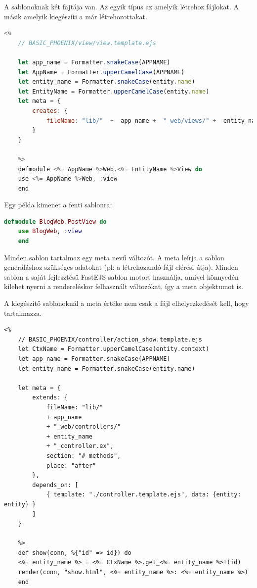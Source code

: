 \documentclass[a4paper,12pt,oneside]{report}
\begin{document}
\begin{justify}

	A sablonoknak két fajtája van. Az egyik típus az amelyik létrehoz fájlokat. A másik amelyik kiegészíti a már létrehozottakat.

	\begin{lstlisting}[language=javascript]
	<%
	// BASIC_PHOENIX/view/view.template.ejs

	let app_name = Formatter.snakeCase(APPNAME)
	let AppName = Formatter.upperCamelCase(APPNAME)
	let entity_name = Formatter.snakeCase(entity.name)
	let EntityName = Formatter.upperCamelCase(entity.name)
	let meta = {
		creates: {
			fileName: "lib/"  +  app_name +  "_web/views/" +  entity_name + "_view.ex"
		}
	}

	%>
	defmodule <%= AppName %>Web.<%= EntityName %>View do
	use <%= AppName %>Web, :view
	end
	\end{lstlisting}

	Egy példa kimenet a fenti sablonra: 

	\begin{lstlisting}[language=elixir]
	defmodule BlogWeb.PostView do
	use BlogWeb, :view
	end
	\end{lstlisting}

	Minden sablon tartalmaz egy meta nevű változót. A meta leírja a sablon generáláshoz szükséges adatokat (pl: a létrehozandó fájl elérési útja). Minden sablon a saját fejlesztésű FastEJS sablon motort használja, amivel könnyedén kilehet nyerni a rendereléskor felhasznált változókat, így a meta objektumot is. 

	A kiegészítő sablonoknál a meta értéke nem csak a fájl elhelyezkedését kell, hogy tartalmazza.

	\begin{lstlisting}[language=ejs]
	<%
	// BASIC_PHOENIX/controller/action_show.template.ejs 
	let CtxName = Formatter.upperCamelCase(entity.context)
	let app_name = Formatter.snakeCase(APPNAME)
	let entity_name = Formatter.snakeCase(entity.name)

	let meta = {
		extends: {
			fileName: "lib/" 
			+ app_name 
			+ "_web/controllers/" 
			+ entity_name 
			+ "_controller.ex",
			section: "# methods",
			place: "after"
		},
		depends_on: [
			{ template: "./controller.template.ejs", data: {entity: entity} }
		]
	}

	%>
	def show(conn, %{"id" => id}) do
	<%= entity_name %> = <%= CtxName %>.get_<%= entity_name %>!(id)
	render(conn, "show.html", <%= entity_name %>: <%= entity_name %>)
	end
	\end{lstlisting}


\end{justify}
\end{document}
